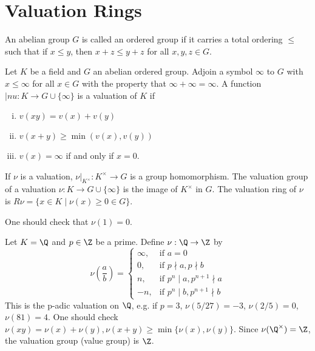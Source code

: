 
\newpage
\section{Valuation Rings}

\begin{dfn}
An abelian group $G$ is called an ordered group if it carries a total ordering $\leq$ such that if $x \leq y$, then $x+z \leq y+z$ for all $x,y,z \in G$. 
\end{dfn}

\begin{dfn}[Valuation]
Let $K$ be a field and $G$ an abelian ordered group. Adjoin a symbol $\infty$ to $G$ with $x \leq \infty$ for all $x \in G$ with the property that $\infty+\infty=\infty$. A function $|nu: K \to G \cup \{\infty\}$ is a valuation of $K$ if 
\begin{enumerate}[(i)]
\item $v(xy)=v(x)+v(y)$
\item $v(x+y) \geq \min(v(x),v(y))$
\item $v(x)= \infty$ if and only if $x=0$.
\end{enumerate}
If $\nu$ is a valuation, $\nu|_{K^\times}: K^\times \to G$ is a group homomorphism. The valuation group of a valuation $\nu: K \to G \cup \{\infty\}$ is the image of $K^\times$ in $G$. The valuation ring of $\nu$ is $R\nu = \{x \in K \;|\; \nu(x) \geq 0 \in G\}$. 
\end{dfn}

\begin{rem}
One should check that $\nu(1)=0$.
\end{rem}

\begin{ex}
Let $K=\Q$ and $p \in \Z$ be a prime. Define $\nu: \Q \to \Z$ by
\[
\nu\left(\frac{a}{b}\right)=
\begin{cases}
\infty, & \text{if } a=0 \\
0, &  \text{if } p \nmid a, p \nmid b \\
n, &  \text{if } p^n \mid a, p^{n+1} \nmid a \\
-n, &  \text{if } p^n \mid b, p^{n+1} \nmid b
\end{cases}
\]
This is the p-adic valuation on $\Q$, e.g. if $p=3$, $\nu(5/27)=-3$, $\nu(2/5)=0$, $\nu(81)=4$. One should check $\nu(xy)=\nu(x)+\nu(y), \nu(x+y) \geq \min\{\nu(x),\nu(y)\}$. Since $\nu(\Q^\times)=\Z$, the valuation group (value group) is $\Z$. 
\end{ex}

